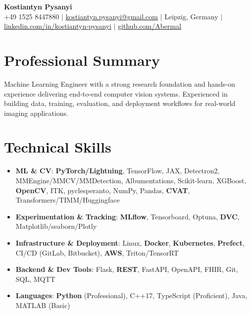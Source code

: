 \documentclass[letterpaper,10pt]{article}
\newcommand{\resumeItem}[1]{
    \item\small{#1}\vspace{-0.5pt}
}
\newcommand{\resumeSubHeadingList}{\begin{itemize}[leftmargin=0.15in, label={}]\vspace{-2pt}}
\newcommand{\resumeSubHeadingListEnd}{\end{itemize}}
\begin{document}
\begin{center}
  \textbf{\Huge Kostiantyn Pysanyi}\vspace{4pt} \\
  \small +49 1525 8447880 $|$ \href{mailto:kostiantyn.pysanyi@gmail.com}{kostiantyn.pysanyi@gmail.com} $|$ Leipzig, Germany $|$
  \href{https://www.linkedin.com/in/kostiantyn-pysanyi/}{linkedin.com/in/kostiantyn-pysanyi} $|$ \href{https://github.com/Abermal}{github.com/Abermal}
\end{center}



\section{Professional Summary}
Machine Learning Engineer with a strong research foundation and hands-on experience delivering end-to-end computer vision systems. Experienced in building data, training, evaluation, and deployment workflows for real-world imaging applications.

\section{Technical Skills}
\resumeSubHeadingList
  \resumeItem{\textbf{ML \& CV}: \textbf{PyTorch/Lightning}, TensorFlow, JAX, Detectron2, MMEngine/MMCV/MMDetection, Albumentations, Scikit-learn, XGBoost, \textbf{OpenCV}, ITK, pyclesperanto, NumPy, Pandas, \textbf{CVAT}, Transformers/TIMM/Huggingface}
  \resumeItem{\textbf{Experimentation \& Tracking}: \textbf{MLflow}, Tensorboard, Optuna, \textbf{DVC}, Matplotlib/seaborn/Plotly}
  \resumeItem{\textbf{Infrastructure \& Deployment}: Linux, \textbf{Docker}, \textbf{Kubernetes}, \textbf{Prefect}, CI/CD (GitLab, Bitbucket), \textbf{AWS}, Triton/TensorRT}
  \resumeItem{\textbf{Backend \& Dev Tools}: Flask, \textbf{REST}, FastAPI, OpenAPI, FHIR, Git, SQL, MQTT}
  \resumeItem{\textbf{Languages}: \textbf{Python} (Professional), C++17, TypeScript (Proficient), Java, MATLAB (Basic)}
\resumeSubHeadingListEnd
\end{document}
